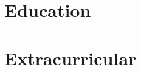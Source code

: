 \documentclass[10pt]{article}
\begin{document}
        \begin{minipage}[t]{0.35\textwidth}
            \vspace{0pt}

            \section{Education}

                

                

            \section{Extracurricular}

                

                

                
        \end{minipage}
\end{document}
